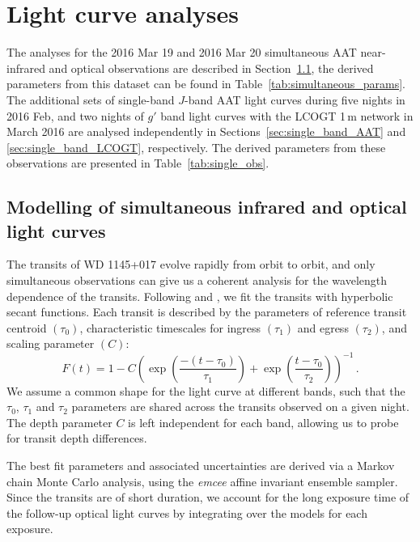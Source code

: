 \documentclass[useAMS,usenatbib]{mn2e}
\begin{document}
\section{Light curve analyses}
\label{sec:lightcurve_model}

The analyses for the 2016 Mar 19 and 2016 Mar 20 simultaneous AAT near-infrared and optical observations are described in Section~\ref{sec:simultaneous_lc}, the derived parameters from this dataset can be found in Table~\ref{tab:simultaneous_params}. The additional sets of single-band $J$-band AAT light curves during five nights in 2016 Feb, and two nights of $g'$ band light curves with the LCOGT 1\,m network in March 2016 are analysed independently in Sections~\ref{sec:single_band_AAT} and \ref{sec:single_band_LCOGT}, respectively. The derived parameters from these observations are presented in Table~\ref{tab:single_obs}. 

\subsection{Modelling of simultaneous infrared and optical light curves}
\label{sec:simultaneous_lc}

The transits of WD 1145+017 evolve rapidly from orbit to orbit, and only simultaneous observations can give us a coherent analysis for the wavelength dependence of the transits. Following \citet{2014ApJ...784...40R} and \citet{2015arXiv151006434C}, we fit the transits with hyperbolic secant functions. Each transit is described by the parameters of reference transit centroid $(\tau_0)$, characteristic timescales for ingress $(\tau_1)$ and egress $(\tau_2)$, and scaling parameter $(C)$:
\begin{equation}
\label{eq:model}
  F(t) = 1 - C \left( \exp \left(\frac{-(t-\tau_0)}{\tau_1} \right) + \exp \left(\frac{t-\tau_0}{\tau_2} \right) \right)^{-1}\,.
\end{equation}
We assume a common shape for the light curve at different bands, such that the $\tau_0$, $\tau_1$ and $\tau_2$ parameters are shared across the transits observed on a given night. The depth parameter $C$ is left independent for each band, allowing us to probe for transit depth differences.

The best fit parameters and associated uncertainties are derived via a Markov chain Monte Carlo analysis, using the \emph{emcee} \citep{2013PASP..125..306F} affine invariant ensemble sampler. Since the transits are of short duration, we account for the long exposure time of the follow-up optical light curves by integrating over the models for each exposure.
\end{document}
